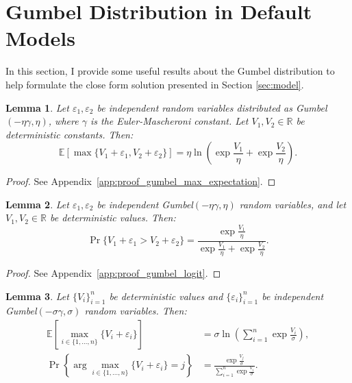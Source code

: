 \documentclass[12pt]{article}
\theoremstyle{plain}
\newtheorem{lemma}{Lemma}
\begin{document}
\section{Gumbel Distribution in Default Models}\label{app:gumbel}
In this section, I provide some useful results about the Gumbel distribution to
help formulate the close form solution presented in Section \ref{sec:model}.

\begin{lemma}
	\label{lem:gumbel_max_expectation}
	Let $\varepsilon_1, \varepsilon_2$ be independent random variables distributed as Gumbel$(-\eta\gamma, \eta)$, where $\gamma$ is the Euler-Mascheroni constant. Let $V_1, V_2 \in \mathbb{R}$ be deterministic constants. Then:
	\begin{equation}
		\mathbb{E}\left[\max\{V_1 + \varepsilon_1, V_2 + \varepsilon_2\}\right] = \eta \ln\left( \exp\frac{V_1}{\eta} + \exp\frac{V_2}{\eta} \right).
	\end{equation}
\end{lemma}

\begin{proof}
	See Appendix~\ref{app:proof_gumbel_max_expectation}.
\end{proof}

\begin{lemma}
	\label{lem:gumbel_logit}
	Let $\varepsilon_1, \varepsilon_2$ be independent Gumbel$(-\eta\gamma, \eta)$ random variables, and let $V_1, V_2 \in \mathbb{R}$ be deterministic values. Then:
	\begin{equation}
		\Pr\{V_1 + \varepsilon_1 > V_2 + \varepsilon_2\} = \frac{\exp\frac{V_1}{\eta}}{\exp\frac{V_1}{\eta} + \exp\frac{V_2}{\eta}}.
	\end{equation}
\end{lemma}

\begin{proof}
	See Appendix~\ref{app:proof_gumbel_logit}.
\end{proof}

\begin{lemma}
	\label{lem:gumbel_multinomial}
	Let $\{V_i\}_{i=1}^n$ be deterministic values and $\{\varepsilon_i\}_{i=1}^n$ be independent Gumbel$(-\sigma\gamma, \sigma)$ random variables. Then:
	\begin{align}
		\mathbb{E}\left[\max_{i \in \{1,\ldots,n\}} \{V_i + \varepsilon_i\}\right]    & = \sigma \ln\left( \sum_{i=1}^n \exp\frac{V_i}{\sigma} \right),       \\
		\Pr\left\{\arg\max_{i \in \{1,\ldots,n\}} \{V_i + \varepsilon_i\} = j\right\} & = \frac{\exp\frac{V_j}{\sigma}}{\sum_{i=1}^n \exp\frac{V_i}{\sigma}}.
	\end{align}
\end{lemma}
\end{document}
